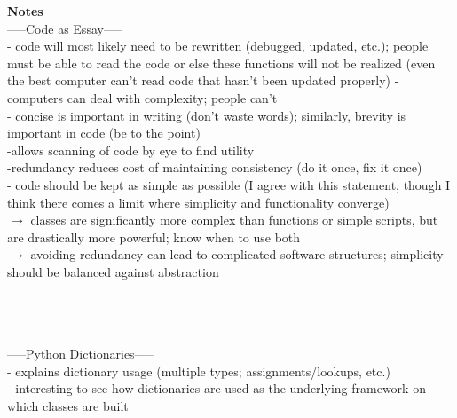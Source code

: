 \documentclass{report}
\newcommand{\tab}{\-\hspace{1cm}}
\begin{document}
\newpage

\textbf{Notes}\\

-----Code as Essay-----\\
- code will most likely need to be rewritten (debugged, updated, etc.); people must be able to read the code or else these functions will not be realized (even the best computer can't read code that hasn't been updated properly)
- computers can deal with complexity; people can't \\
- concise is important in writing (don't waste words); similarly, brevity is important in code (be to the point)\\
	\tab -allows scanning of code by eye to find utility \\
	\tab -redundancy reduces cost of maintaining consistency (do it once, fix it once) \\
- code should be kept as simple as possible (I agree with this statement, though I think there comes a limit where simplicity and functionality converge)\\
	\tab $\rightarrow$ classes are significantly more complex than functions or simple scripts, but are drastically more powerful; know when to use both\\
	\tab $\rightarrow$ avoiding redundancy can lead to complicated software structures; simplicity should be balanced against abstraction

\-\\
\-\\
\-\\
-----Python Dictionaries-----\\
- explains dictionary usage (multiple types; assignments/lookups, etc.) \\
- interesting to see how dictionaries are used as the underlying framework on which classes are built
\end{document}
